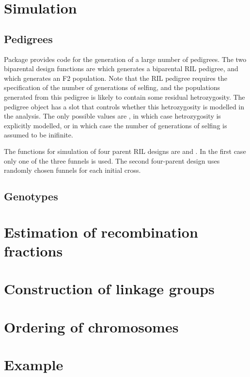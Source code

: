\documentclass[a4paper, nojss, shortnames]{jss}\usepackage[]{graphicx}\usepackage[]{color}
\begin{document}
\section{Simulation}

\subsection{Pedigrees}

Package  provides code for the generation of a large number of pedigrees. The two biparental design functions are  which generates a biparental RIL pedigree, and  which generates an F2 population. Note that the RIL pedigree requires the specification of the number of generations of selfing, and the populations generated from this pedigree is likely to contain some residual hetrozygosity. The pedigree object has a slot  that controls whether this hetrozygosity is modelled in the analysis. The only possible values are , in which case hetrozygosity is explicitly modelled, or  in which case the number of generations of selfing is assumed to be inifinite. 

The functions for simulation of four parent RIL designs are  and . In the first case only one of the three funnels is used. The second four-parent design uses randomly chosen funnels for each initial cross. 

\subsection{Genotypes}

\section{Estimation of recombination fractions}

\section{Construction of linkage groups}

\section{Ordering of chromosomes}

\section{Example}


\end{document}
